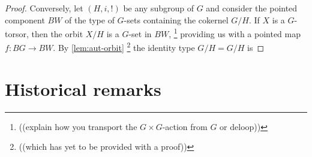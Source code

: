 {\begin{proof}
Conversely, let $(H,i,!)$ be any subgroup of $G$ and consider the pointed component $BW$ of the type of $G$-sets containing the cokernel $G/H$.  If $X$ is a $G$-torsor, then the orbit $X/H$ is a $G$-set in $BW$, \footnote{((explain how you transport the $G\times G$-action from $G$ or deloop))}
providing us with a pointed map $f:BG\to BW$.
By \cref{lem:aut-orbit} \footnote{((which has yet to be provided with a proof))} the identity type $G/H=G/H$ is 


\end{proof}
}%





\section{Historical remarks}
\label{sec:grouphistory}

